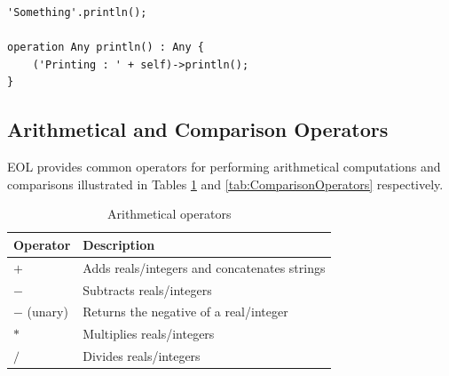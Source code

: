 \begin{lstlisting}[basicstyle=\ttfamily\footnotesize, flexiblecolumns=true, numbers=none, nolol=true, caption=Invoking operations using EOL, label=lst:Expressions, numbers=left, language=EOL, tabsize=2]
'Something'.println();

operation Any println() : Any {
	('Printing : ' + self)->println();
}
\end{lstlisting}

\subsection{Arithmetical and Comparison Operators}

EOL provides common operators for performing arithmetical computations and comparisons illustrated in Tables \ref{tab:ArithmeticalOperators} and \ref{tab:ComparisonOperators} respectively.

%
%

\begin{longtable} {|p{5.5cm}|p{6.5cm}|}
			
			\caption{Arithmetical operators}
			\label{tab:ArithmeticalOperators}\\
			
			\hline
							
			\textbf{Operator} & \textbf{Description} \\\hline

				$+$ & Adds reals/integers and concatenates strings \\\hline
	
				$-$ & Subtracts reals/integers \\\hline
				
				$-$ (unary) & Returns the negative of a real/integer \\\hline
				
				$*$ & Multiplies reals/integers \\\hline
				
				$/$ & Divides reals/integers \\\hline
				
\end{longtable}


